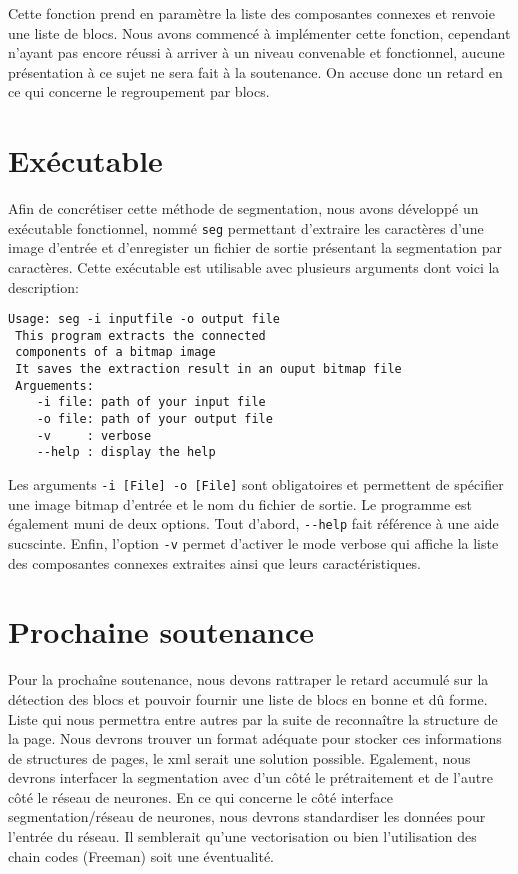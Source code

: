 \documentclass[a4paper,10pt]{report}
\begin{document}
Cette fonction prend en paramètre la liste des composantes connexes et
renvoie une liste de blocs. Nous avons commencé à implémenter cette
fonction, cependant n'ayant pas encore réussi à arriver à un niveau
convenable et fonctionnel, aucune présentation à ce sujet ne sera fait
à la soutenance. On accuse donc un retard en ce qui concerne le
regroupement par blocs.

\section{Exécutable}
Afin de concrétiser cette méthode de segmentation, nous avons développé
un exécutable fonctionnel, nommé \verb!seg! permettant
d'extraire les caractères d'une image d'entrée et d'enregister un
fichier de sortie présentant la segmentation par caractères. Cette
exécutable est utilisable avec plusieurs arguments dont voici la
description:

\begin{verbatim}
Usage: seg -i inputfile -o output file
 This program extracts the connected 
 components of a bitmap image
 It saves the extraction result in an ouput bitmap file
 Arguements:
    -i file: path of your input file
    -o file: path of your output file
    -v     : verbose
    --help : display the help
\end{verbatim}

Les arguments \verb!-i [File] -o [File]! sont obligatoires et permettent
de spécifier une image bitmap d'entrée et le nom du fichier de sortie.
Le programme est également muni de deux options. Tout d'abord,
\verb!--help! fait référence à une aide sucscinte. Enfin, l'option
\verb!-v! permet d'activer le mode verbose qui affiche la liste des
composantes connexes extraites ainsi que leurs caractéristiques.

\section{Prochaine soutenance}
Pour la prochaîne soutenance, nous devons rattraper le retard accumulé
sur la détection des blocs et pouvoir fournir une liste de blocs en
bonne et dû forme. Liste qui nous permettra entre autres par la suite de
reconnaître la structure de la page. Nous devrons trouver un format
adéquate pour stocker ces informations de structures de pages, le xml
serait une solution possible. Egalement, nous devrons interfacer la
segmentation avec d'un côté le prétraitement et de l'autre côté le
réseau de neurones. En ce qui concerne le côté interface
segmentation/réseau de neurones, nous devrons standardiser les données
pour l'entrée du réseau. Il semblerait qu'une vectorisation ou bien
l'utilisation des chain codes (Freeman) soit une éventualité.
\end{document}
